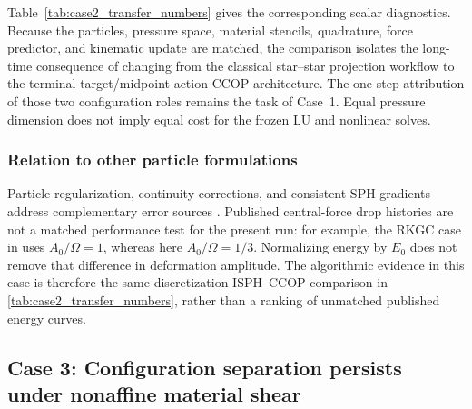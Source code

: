 \documentclass[11pt]{article}
\theoremstyle{plain}
\theoremstyle{definition}
\theoremstyle{remark}
\begin{document}
Table~\ref{tab:case2_transfer_numbers} gives the corresponding scalar
diagnostics.  Because the particles, pressure space, material stencils,
quadrature, force predictor, and kinematic update are matched, the comparison
isolates the long-time consequence of changing from the classical star--star
projection workflow to the terminal-target/midpoint-action CCOP architecture.
The one-step attribution of those two configuration roles remains the task of
Case~1.  Equal pressure dimension does not imply equal cost for the frozen LU
and nonlinear solves.

\subsubsection{Relation to other particle formulations}

Particle regularization, continuity corrections, and consistent SPH gradients
address complementary error sources
\cite{Wang2019IPST,GotohKhayyerGotoh2024,ZhangHighOrderSPH}.
Published central-force drop histories are not a matched performance test
for the present run: for example, the RKGC case in
\cite[section~5.4]{ZhangHighOrderSPH} uses $A_0/\Omega=1$, whereas here
$A_0/\Omega=1/3$.  Normalizing energy by $E_0$ does not remove that difference
in deformation amplitude.  The algorithmic evidence in this case is therefore
the same-discretization ISPH--CCOP comparison in
\cref{tab:case2_transfer_numbers}, rather than a ranking of unmatched
published energy curves.

\subsection{Case 3: Configuration separation persists under nonaffine material shear}
\label{sec:result3}
\end{document}
